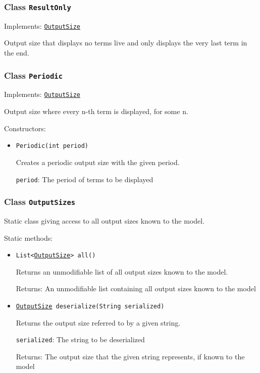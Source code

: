 \subsubsection{Class \texttt{ResultOnly}}
\label{type:edu.kit.wavelength.client.model.output.ResultOnly}
Implements: \texttt{\hyperref[type:edu.kit.wavelength.client.model.output.OutputSize]{OutputSize}}

Output size that displays no terms live and
 only displays the very last term in the end.

\subsubsection{Class \texttt{Periodic}}
\label{type:edu.kit.wavelength.client.model.output.Periodic}
Implements: \texttt{\hyperref[type:edu.kit.wavelength.client.model.output.OutputSize]{OutputSize}}

Output size where every n-th term is displayed, for some n.

Constructors:
\begin{itemize}
\item \texttt{Periodic(int period)}

Creates a periodic output size with the given period.

\texttt{period}: The period of terms to be displayed

\end{itemize}

\subsubsection{Class \texttt{OutputSizes}}
\label{type:edu.kit.wavelength.client.model.output.OutputSizes}
Static class giving access to all output sizes known to the model.

Static methods:
\begin{itemize}
\item \texttt{List<\hyperref[type:edu.kit.wavelength.client.model.output.OutputSize]{OutputSize}> all()}

Returns an unmodifiable list of all output sizes known to the model.

Returns: An unmodifiable list containing all output sizes known to the
 model

\item \texttt{\hyperref[type:edu.kit.wavelength.client.model.output.OutputSize]{OutputSize} deserialize(String serialized)}

Returns the output size referred to by a given string.

\texttt{serialized}: The string to be deserialized

Returns: The output size that the given string represents, if known to the model

\end{itemize}

